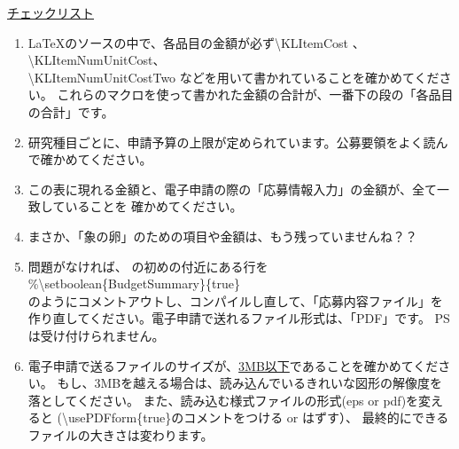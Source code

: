 \vspace{1cm}
\underline{チェックリスト}
\begin{enumerate}
	\item \LaTeX のソースの中で、各品目の金額が必ず\textbackslash KLItemCost 、
		\textbackslash KLItemNumUnitCost、\\
		\textbackslash KLItemNumUnitCostTwo などを用いて書かれていることを確かめてください。
		これらのマクロを使って書かれた金額の合計が、一番下の段の「各品目の合計」です。

%		
	
	\item 研究種目ごとに、申請予算の上限が定められています。公募要領をよく読んで確かめてください。
	\item この表に現れる金額と、電子申請の際の「応募情報入力」の金額が、全て一致していることを
		確かめてください。
		
	\item まさか、「象の卵」のための項目や金額は、もう残っていませんね？？
		
	\item 問題がなければ、 \KLMainFile の初めの付近にある行を\\
				\hspace{2cm}\%\textbackslash setboolean\{BudgetSummary\}\{true\}\\
		のようにコメントアウトし、コンパイルし直して、「応募内容ファイル」を
		作り直してください。電子申請で送れるファイル形式は、「PDF」です。
		PSは受け付けられません。
		
	\item 電子申請で送るファイルのサイズが、\underline{3MB以下}であることを確かめてください。
		もし、3MBを越える場合は、読み込んでいるきれいな図形の解像度を落としてください。
		また、読み込む様式ファイルの形式(eps or pdf)を変えると
		(\textbackslash usePDFform\{true\}のコメントをつける or はずす）、
		最終的にできるファイルの大きさは変わります。
\end{enumerate}

